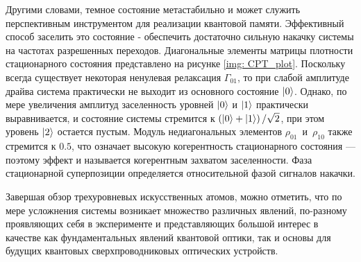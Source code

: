 Другими словами, темное состояние метастабильно и может служить перспективным инструментом для реализации квантовой памяти. Эффективный способ заселить это состояние - обеспечить достаточно сильную накачку системы на частотах разрешенных переходов. Диагональные элементы матрицы плотности стационарного состояния представлено на рисунке \ref{img: CPT_plot}. Поскольку всегда существует некоторая ненулевая релаксация $\Gamma_{01}$, то при слабой амплитуде драйва система практически не выходит из основного состояние $\ket{0}$. Однако, по мере увеличения амплитуд заселенность уровней $\ket{0}$ и $\ket{1}$ практически выравнивается, и состояние системы стремится к $\left(\ket{0}+\ket{1}\right)/\sqrt{2}$, при этом уровень $\ket{2}$ остается пустым. Модуль недиагональных элементов $\rho_{01}$~и~$\rho_{10}$ также стремится к $0.5$, что означает высокую когерентность стационарного состояния --- поэтому эффект и называется когерентным захватом заселенности. Фаза стационарной суперпозиции определяется относительной фазой сигналов накачки. 


Завершая обзор трехуровневых искусственных атомов, можно отметить, что по мере усложнения системы возникает множество различных явлений, по-разному проявляющих себя в эксперименте и представляющих большой интерес в качестве как фундаментальных явлений квантовой оптики, так и основы для будущих квантовых сверхпроводниковых оптических устройств. 

